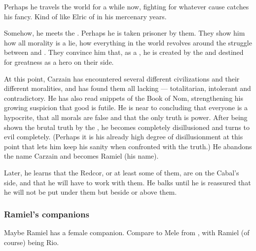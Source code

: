 \begin{garbage}
Perhaps he travels the world for a while now, fighting for whatever cause catches his fancy. Kind of like Elric of \Melnibone{} in his mercenary years. 

Somehow, he meets the \banes. Perhaps he is taken prisoner by them. They show him how all morality is a lie, how everything in the world revolves around the struggle between \dragons{} and \banes. They convince him that, as a \Malach, he is created by the \banes{} and destined for greatness as a hero on their side. 

At this point, Carzain has encountered several different civilizations and their different moralities, and has found them all lacking --- totalitarian, intolerant and contradictory. He has also read snippets of the Book of Nom, strengthening his growing suspicion that good is futile. He is near to concluding that everyone is a hypocrite, that all morals are false and that the only truth is power. 
After being shown the brutal truth by the \banes, he becomes completely disillusioned and turns to evil completely. (Perhaps it is his already high degree of disillusionment at this point that lets him keep his sanity when confronted with the truth.) 
He abandons the name Carzain \Shireyo{} and becomes Ramiel (his \Malach{} name). 

Later, he learns that the Redcor, or at least some of them, are on the Cabal's side, and that he will have to work with them. He balks until he is reassured that he will not be put under them but beside or above them. 








\subsubsection{Ramiel's companions}
Maybe Ramiel has a female companion. 
Compare to Mele from \emph{\JuukenSentaiGekiranger}, with Ramiel (of course) being Rio. 


\end{garbage}
